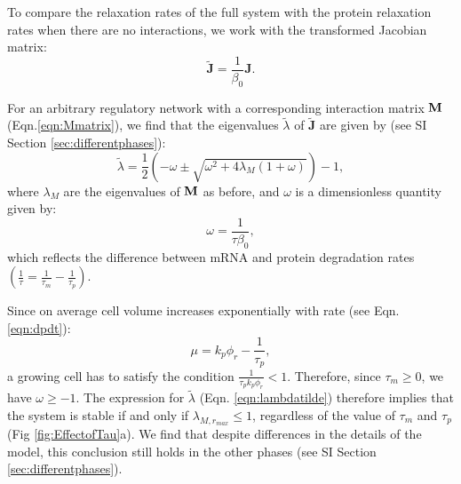 \documentclass[10pt]{article}
\begin{document}
To compare the relaxation rates of the full system with the protein relaxation rates when there are no interactions, we work with the transformed Jacobian matrix:
\begin{equation}
    \mathbf{\tilde{J}} =\frac{1}{\beta_0} \mathbf{J}. \label{eqn:Jtilde}
\end{equation}

For an arbitrary regulatory network with a corresponding interaction matrix $\bf{M}$ (Eqn.\ref{eqn:Mmatrix}), we find that the eigenvalues $\tilde{\lambda}$ of $\mathbf{\tilde{J}}$ are given by (see SI Section \ref{sec:differentphases}):
\begin{equation}
    \tilde{\lambda} = \frac{1}{2} \left(-\omega \pm \sqrt{\omega^2 + 4\lambda_M (1+\omega)} \right) - 1, 
    \label{eqn:lambdatilde}
\end{equation}
where $\lambda_M$ are the eigenvalues of $\bf{M}$ as before, and $\omega$ is a dimensionless quantity given by:
\begin{equation}
    \omega = \frac{1}{\tau \beta_{0}},
    \label{eqn:omega}
\end{equation}
which reflects the difference between mRNA and protein degradation rates $\left(\frac{1}{\tau}=\frac{1}{\tau_m}-\frac{1}{\tau_p}\right)$. 

Since on average cell volume increases exponentially with rate (see Eqn. \ref{eqn:dpdt}):
\begin{equation}
    \mu = k_p \phi_r - \frac{1}{\tau_p},
    \label{eqn:mu1}
\end{equation}
a growing cell has to satisfy the condition $\frac{1}{\tau_p k_p \phi_r} < 1$. Therefore, since $\tau_m \geq 0$, we have $\omega \geq -1$. The expression for $\tilde{\lambda}$ (Eqn. \ref{eqn:lambdatilde}) therefore implies that the system is stable if and only if $\lambda_{M,r_{max}} \leq 1$, regardless of the value of $\tau_m$ and $\tau_p$ (Fig \ref{fig:EffectofTau}a). We find that despite differences in the details of the model, this conclusion still holds in the other phases (see SI Section \ref{sec:differentphases}).
\end{document}
